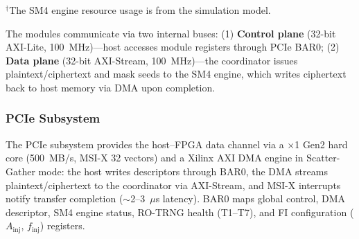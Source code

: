 \documentclass[journal]{IEEEtran}
\begin{document}
\begin{table}[t]
\renewcommand{\arraystretch}{1.1}
\caption{Functional Module Specification}
\label{tab:modules}
\scriptsize $^{\dagger}$The SM4 engine resource usage is from the simulation model.
\end{table}

The modules communicate via two internal buses: (1) \textbf{Control plane} (32-bit AXI-Lite, 100~MHz)---host accesses module registers through PCIe BAR0; (2) \textbf{Data plane} (32-bit AXI-Stream, 100~MHz)---the coordinator issues plaintext/ciphertext and mask seeds to the SM4 engine, which writes ciphertext back to host memory via DMA upon completion.

\subsubsection{PCIe Subsystem}

The PCIe subsystem provides the host--FPGA data channel via a $\times$1 Gen2 hard core (500~MB/s, MSI-X 32 vectors) and a Xilinx AXI DMA engine in Scatter-Gather mode: the host writes descriptors through BAR0, the DMA streams plaintext/ciphertext to the coordinator via AXI-Stream, and MSI-X interrupts notify transfer completion ($\sim$2--3~$\mu$s latency). BAR0 maps global control, DMA descriptor, SM4 engine status, RO-TRNG health (T1--T7), and FI configuration ($A_{\text{inj}}$, $f_{\text{inj}}$) registers.
\end{document}

